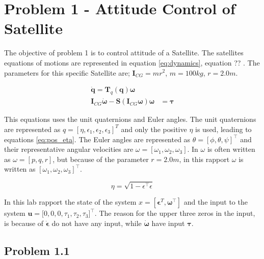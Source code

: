 \section*{Problem 1 - Attitude Control of Satellite}

The objective of problem 1 is to control attitude of a Satellite. The satellites equations of motions are represented in equation \eqref{eq:dynamics}, equation ??  \cite{Fossen2011}. The parameters for this specific Satellite are; $\mathbf{I}_{CG} = mr^2$, $m = 100 kg$, $r = 2.0 m$. 

\begin{subequations}
\label{eq:dynamics}
	\begin{align}
		\dot{\mathbf{q}} = \mathbf{T}_q (\mathbf{q} ) \boldsymbol{\omega} \\
		\mathbf{I}_{CG} \dot{\boldsymbol{\omega}} - \mathbf{S} (\mathbf{I}_{CG} \boldsymbol{\omega} ) \boldsymbol{\omega} & =  \boldsymbol{\tau} 
		\label{eq:EOM_omega_dot}
	\end{align}	
\end{subequations}

This equations uses the unit quaternions and Euler angles. The unit  quaternions are represented as $q = [\eta, \epsilon_1, \epsilon_2, \epsilon_3]^T$ and only the positive $\eta$ is used, leading to equations \eqref{eq:pos_eta}. The Euler angles are represented as $\theta = [\phi , \theta , \psi]^\top$ and their representative angular velocities are  $\omega = [\omega_1, \omega_2, \omega_3]$. In \cite{Fossen2011} $\omega$ is often written as $\omega = [p,q,r]$, but because of the parameter $r = 2.0m$, in this rapport $\omega$ is written as $[\omega_1, \omega_2, \omega_3]^\top$.

\begin{equation}
    \eta = \sqrt{1 - \epsilon^\top \epsilon} 
    \label{eq:pos_eta}
\end{equation}
 
In this lab rapport the state of the system $x = [ \boldsymbol{\epsilon}^T, \boldsymbol{\omega}^\top]$ and the input to the system $\mathbf{u} = \boldsymbol[0,0,0,\tau_1, \tau_2, \tau_3]^\top$. The reason for the upper three zeros in the input, is because of $\dot{\boldsymbol{\epsilon}}$ do not have any input, while $\dot{\boldsymbol{\omega}}$ have input $\boldsymbol{\tau}$.


\subsection*{Problem 1.1}

